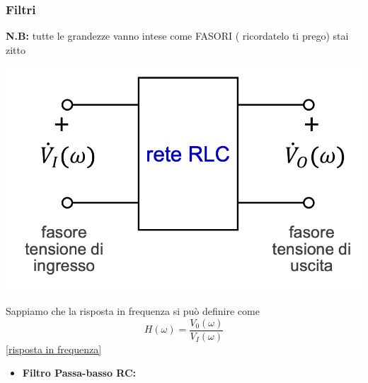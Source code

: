 \documentclass{article}
\theoremstyle{definition}
\begin{document}
\begin{itemize}
\subsubsection{Filtri}
\textbf{N.B:} tutte le grandezze vanno intese come FASORI ( ricordatelo ti prego) stai zitto
	\begin{center}
	\includegraphics[scale=0.35]{immagini/bipolo}
\end{center}
Sappiamo che la risposta in frequenza si può definire come 
$$H(\omega)=\frac{V_0(\omega)}{V_I(\omega)}$$\ref{risposta in frequenza}
\begin{itemize}
\item \textbf{Filtro Passa-basso RC:} \\


\end{itemize}
\end{itemize}
\end{document}
